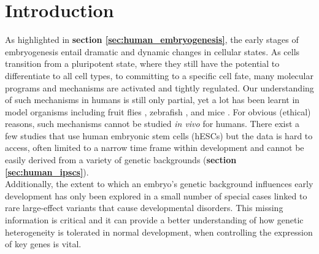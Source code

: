 \newpage

\section{Introduction}
\label{sec:endodiff_intro}

As highlighted in \textbf{section 
\ref{sec:human_embryogenesis}},
the early stages of embryogenesis entail dramatic and dynamic changes in cellular states. 
As cells transition from a pluripotent state, where they still have the potential to differentiate to all cell types, to committing to a specific cell fate, many molecular programs and mechanisms are activated and tightly regulated.
Our understanding of such mechanisms in humans is still only partial, yet a lot has been learnt in model organisms including fruit flies \cite{rivera1996gradients, tomancak2002systematic, cusanovich2018cis}, zebrafish \cite{grunwald2002headwaters, ober2003endoderm, traver2003transplantation}, and mice \cite{corson2003spatial, tam2007gene, pijuan2019single}.
For obvious (ethical) reasons, such mechanisms cannot be studied \textit{in vivo} for humans. 
There exist a few studies that use human embryonic stem cells (hESCs) but the data is hard to access, often limited to a narrow time frame within development and cannot be easily derived from a variety of genetic backgrounds 
(\textbf{section 
\ref{sec:human_ipscs}}).
\\

Additionally, the extent to which an embryo’s genetic background influences early development has only been explored in a small number of special cases linked to rare large-effect variants that cause developmental disorders. 
This missing information is critical and it can provide a better understanding of how genetic heterogeneity is tolerated in normal development, when controlling the expression of key genes is vital.\\

